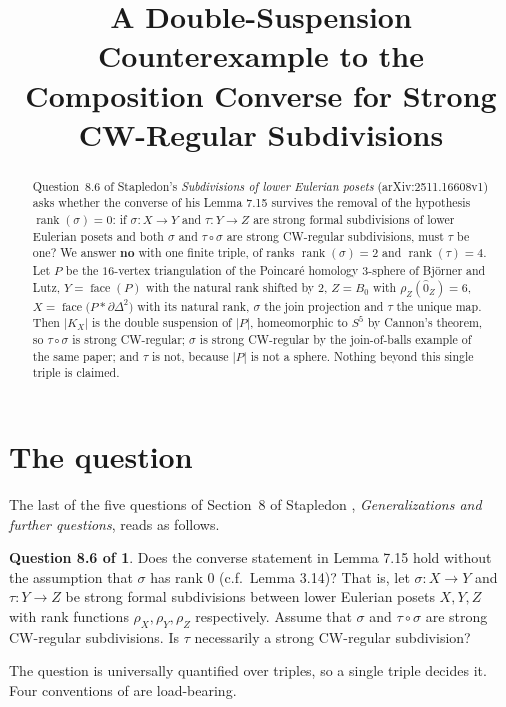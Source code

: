 \documentclass[11pt]{amsart}
\title[A double-suspension counterexample]
{A Double-Suspension Counterexample to the Composition Converse for Strong CW-Regular Subdivisions}
\date{}
\theoremstyle{definition}
\newtheorem*{question}{Question 8.6 of \cite{Stapledon}}
\theoremstyle{remark}
\DeclareMathOperator{\rank}{rank}
\newcommand{\face}{\operatorname{face}}
\newcommand{\Ohat}{\widehat{0}}
\newcommand{\bd}{\partial}
\newcommand{\join}{*}
\begin{document}
\begin{abstract}
Question~8.6 of Stapledon's \emph{Subdivisions of lower Eulerian posets}
(arXiv:2511.16608v1) asks whether the converse of his Lemma 7.15 survives the removal of
the hypothesis $\rank(\sigma)=0$: if $\sigma\colon X\to Y$ and $\tau\colon Y\to Z$ are
strong formal subdivisions of lower Eulerian posets and both $\sigma$ and $\tau\circ\sigma$
are strong CW-regular subdivisions, must $\tau$ be one? We answer \textbf{no} with one
finite triple, of ranks $\rank(\sigma)=2$ and $\rank(\tau)=4$. Let $P$ be the $16$-vertex
triangulation of the Poincar\'e homology $3$-sphere of Bj\"orner and Lutz, $Y=\face(P)$
with the natural rank shifted by $2$, $Z=B_0$ with $\rho_Z(\Ohat_Z)=6$,
$X=\face\bigl(P\join\bd\Delta^2\bigr)$ with its natural rank, $\sigma$ the join projection
and $\tau$ the unique map. Then $|K_X|$ is the double suspension of $|P|$, homeomorphic to
$S^5$ by Cannon's theorem, so $\tau\circ\sigma$ is strong CW-regular; $\sigma$ is strong
CW-regular by the join-of-balls example of the same paper; and $\tau$ is not, because $|P|$
is not a sphere. Nothing beyond this single triple is claimed.
\end{abstract}

\maketitle

\section{The question}\label{sec:question}

The last of the five questions of Section~8 of Stapledon \cite{Stapledon},
\emph{Generalizations and further questions}, reads as follows.

\begin{question}
Does the converse statement in Lemma 7.15 hold without the assumption that $\sigma$ has
rank $0$ (c.f.\ Lemma 3.14)? That is, let $\sigma\colon X\to Y$ and $\tau\colon Y\to Z$ be
strong formal subdivisions between lower Eulerian posets $X,Y,Z$ with rank functions
$\rho_X,\rho_Y,\rho_Z$ respectively. Assume that $\sigma$ and $\tau\circ\sigma$ are strong
CW-regular subdivisions. Is $\tau$ necessarily a strong CW-regular subdivision?
\end{question}

The question is universally quantified over triples, so a single triple decides it. Four
conventions of \cite{Stapledon} are load-bearing.
\end{document}
